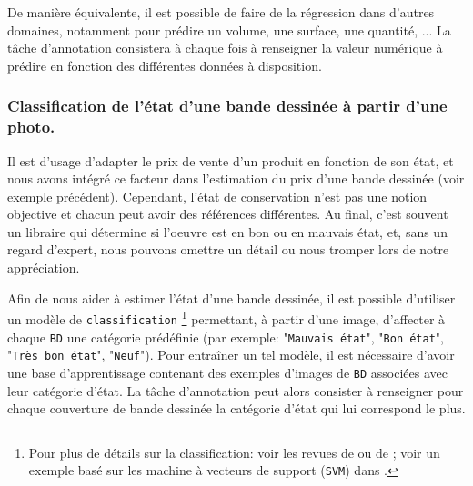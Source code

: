 			\begin{leftBarInformation}
				De manière équivalente, il est possible de faire de la régression dans d'autres domaines, notamment pour prédire un volume, une surface, une quantité, ...
				La tâche d'annotation consistera à chaque fois à renseigner la valeur numérique à prédire en fonction des différentes données à disposition.
			\end{leftBarInformation}
		
		
		\subsubsection{Classification de l'état d'une bande dessinée à partir d'une photo.}
		\label{section:2.1.2.B-PRESENTATION-ANNOTATION-EXEMPLES-CLASSIFICATION}
			
			Il est d'usage d'adapter le prix de vente d'un produit en fonction de son état, et nous avons intégré ce facteur dans l'estimation du prix d'une bande dessinée (voir exemple précédent).
			Cependant, l'état de conservation n'est pas une notion objective et chacun peut avoir des références différentes.
			Au final, c'est souvent un libraire qui détermine si l'oeuvre est en bon ou en mauvais état, et, sans un regard d'expert, nous pouvons omettre un détail ou nous tromper lors de notre appréciation.
			
			Afin de nous aider à estimer l'état d'une bande dessinée, il est possible d'utiliser un modèle de \texttt{classification} \footnote{
				Pour plus de détails sur la classification: voir les revues de \cite{aized-amin-soofi-arshad-awan:2017:classification-techniques-machine} ou de \cite{kotsiantis-etal:2006:machine-learning-review} ; voir un exemple basé sur les machine à vecteurs de support (\texttt{SVM}) dans \cite{cortes-vapnik:1995:supportvector-networks}.
			} permettant, à partir d'une image, d'affecter à chaque \texttt{BD} une catégorie prédéfinie (par exemple: "\texttt{Mauvais état}", "\texttt{Bon état}", "\texttt{Très bon état}", "\texttt{Neuf}").
			Pour entraîner un tel modèle, il est nécessaire d'avoir une base d'apprentissage contenant des exemples d'images de \texttt{BD} associées avec leur catégorie d'état.
			La tâche d'annotation peut alors consister à renseigner pour chaque couverture de bande dessinée la catégorie d'état qui lui correspond le plus.
			
